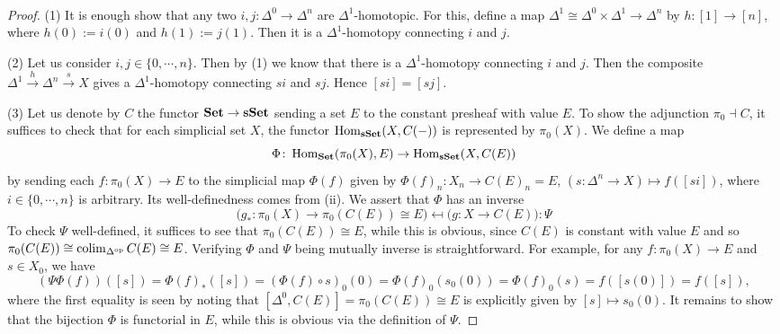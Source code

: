 \documentclass[a4paper,11pt,openany]{scrartcl}
\begin{document}
~\\
\begin{proof}
(1) It is enough show that any two $i,j\colon\Delta^0\to\Delta^n$ are $\Delta^1$-homotopic. For this, define a map $\Delta^1\cong\Delta^0\times\Delta^1\to\Delta^n$ by $h\colon[1]\to[n]$, where $h(0):=i(0)$ and $h(1):=j(1)$. Then it is a $\Delta^1$-homotopy connecting $i$ and $j$.

(2) Let us consider $i,j\in\{0,\cdots,n\}$. Then by (1) we know that there is a $\Delta^1$-homotopy connecting $i$ and $j$. Then the composite $\Delta^1\overset{h}{\to}\Delta^n\overset{s}{\to}X$ gives a $\Delta^1$-homotopy connecting $si$ and $sj$. Hence $[si]=[sj]$.

(3) Let us denote by $C$ the functor $\operatorname{\mathbf{Set}}\to\operatorname{\mathbf{sSet}}$ sending a set $E$ to the constant presheaf with value $E$. To show the adjunction $\pi_0\dashv C$, it suffices to check that for each simplicial set $X$, the functor $\operatorname{Hom}_{\operatorname{\mathbf{sSet}}}(X,C(-))$ is represented by $\pi_0(X)$. We define a map
\[
\Phi\colon\operatorname{Hom}_{\operatorname{\mathbf{Set}}}(\pi_0(X),E)\to\operatorname{Hom}_{\operatorname{\mathbf{sSet}}}(X,C(E))
\]
by sending each $f\colon\pi_0(X)\to E$ to the simplicial map $\Phi(f)$ given by $\Phi(f)_n\colon X_n\to C(E)_n=E$, $(s\colon\Delta^n\to X)\mapsto f([si])$, where $i\in\{0,\cdots,n\}$ is arbitrary. Its well-definedness comes from (ii). We assert that $\Phi$ has an inverse
\[
\Big(g_*\colon\pi_0(X)\to\pi_0(C(E))\cong E\Big)\mapsfrom\Big(g\colon X\to C(E)\Big):\Psi
\]
To check $\Psi$ well-defined, it suffices to see that $\pi_0(C(E))\cong E$, while this is obvious, since $C(E)$ is constant with value $E$ and so $\pi_0(C(E))\cong\operatorname{colim}_{\Delta^{\operatorname{op}}} C(E)\cong E$. Verifying $\Phi$ and $\Psi$ being mutually inverse is straightforward. For example, for any $f\colon\pi_0(X)\to E$ and $s\in X_0$, we have
\[
(\Psi\Phi(f))([s])=\Phi(f)_*([s])=(\Phi(f)\circ s)_0(0)=\Phi(f)_0(s_0(0))=\Phi(f)_0(s)=f([s(0)])=f([s]),
\]
where the first equality is seen by noting that $[\Delta^0,C(E)]=\pi_0(C(E))\cong E$ is explicitly given by $[s]\mapsto s_0(0)$. It remains to show that the bijection $\Phi$ is functorial in $E$, while this is obvious via the definition of $\Psi$.


\end{proof}
\end{document}
